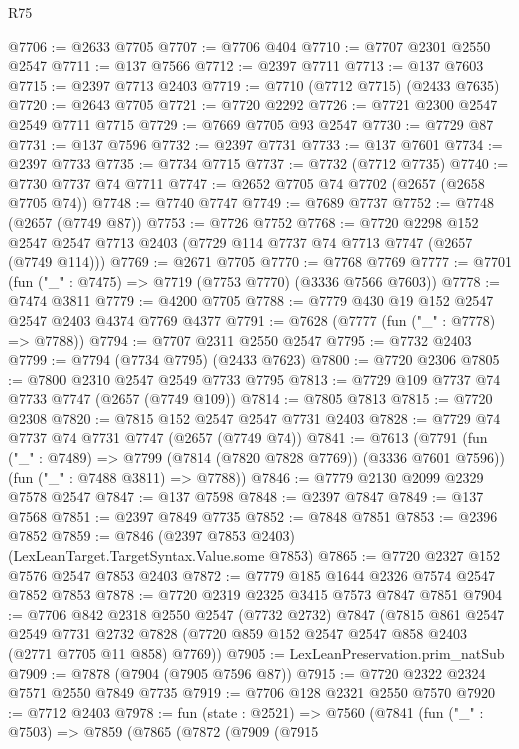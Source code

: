 \begin{lexlean}{R75}
\begin{coremodule}
@7706 := @2633 @7705
@7707 := @7706 @404
@7710 := @7707 @2301 @2550 @2547
@7711 := @137 @7566
@7712 := @2397 @7711
@7713 := @137 @7603
@7715 := @2397 @7713 @2403
@7719 := @7710 (@7712 @7715) (@2433 @7635)
@7720 := @2643 @7705
@7721 := @7720 @2292
@7726 := @7721 @2300 @2547 @2549 @7711 @7715
@7729 := @7669 @7705 @93 @2547
@7730 := @7729 @87
@7731 := @137 @7596
@7732 := @2397 @7731
@7733 := @137 @7601
@7734 := @2397 @7733
@7735 := @7734 @7715
@7737 := @7732 (@7712 @7735)
@7740 := @7730 @7737 @74 @7711
@7747 := @2652 @7705 @74 @7702 (@2657 (@2658 @7705 @74))
@7748 := @7740 @7747
@7749 := @7689 @7737
@7752 := @7748 (@2657 (@7749 @87))
@7753 := @7726 @7752
@7768 := @7720
    @2298
    @152
    @2547
    @2547
    @7713
    @2403
    (@7729 @114 @7737 @74 @7713 @7747 (@2657 (@7749 @114)))
@7769 := @2671 @7705
@7770 := @7768 @7769
@7777 := @7701 (fun ("_" : @7475) => @7719 (@7753 @7770) (@3336 @7566 @7603))
@7778 := @7474 @3811
@7779 := @4200 @7705
@7788 := @7779 @430 @19 @152 @2547 @2547 @2403 @4374 @7769 @4377
@7791 := @7628 (@7777 (fun ("_" : @7778) => @7788))
@7794 := @7707 @2311 @2550 @2547
@7795 := @7732 @2403
@7799 := @7794 (@7734 @7795) (@2433 @7623)
@7800 := @7720 @2306
@7805 := @7800 @2310 @2547 @2549 @7733 @7795
@7813 := @7729 @109 @7737 @74 @7733 @7747 (@2657 (@7749 @109))
@7814 := @7805 @7813
@7815 := @7720 @2308
@7820 := @7815 @152 @2547 @2547 @7731 @2403
@7828 := @7729 @74 @7737 @74 @7731 @7747 (@2657 (@7749 @74))
@7841 := @7613
    (@7791
      (fun ("_" : @7489) => @7799 (@7814 (@7820 @7828 @7769)) (@3336 @7601 @7596))
      (fun ("_" : @7488 @3811) => @7788))
@7846 := @7779 @2130 @2099 @2329 @7578 @2547
@7847 := @137 @7598
@7848 := @2397 @7847
@7849 := @137 @7568
@7851 := @2397 @7849 @7735
@7852 := @7848 @7851
@7853 := @2396 @7852
@7859 := @7846 (@2397 @7853 @2403) (LexLeanTarget.TargetSyntax.Value.some @7853)
@7865 := @7720 @2327 @152 @7576 @2547 @7853 @2403
@7872 := @7779 @185 @1644 @2326 @7574 @2547 @7852 @7853
@7878 := @7720 @2319 @2325 @3415 @7573 @7847 @7851
@7904 := @7706
    @842
    @2318
    @2550
    @2547
    (@7732 @2732)
    @7847
    (@7815
      @861
      @2547
      @2549
      @7731
      @2732
      @7828
      (@7720 @859 @152 @2547 @2547 @858 @2403 (@2771 @7705 @11 @858) @7769))
@7905 := LexLeanPreservation.prim_natSub
@7909 := @7878 (@7904 (@7905 @7596 @87))
@7915 := @7720 @2322 @2324 @7571 @2550 @7849 @7735
@7919 := @7706 @128 @2321 @2550 @7570
@7920 := @7712 @2403
@7978 := fun (state : @2521) =>
  @7560
    (@7841
      (fun ("_" : @7503) =>
      @7859
        (@7865
          (@7872
            (@7909
              (@7915

\end{coremodule}
\end{lexlean}
